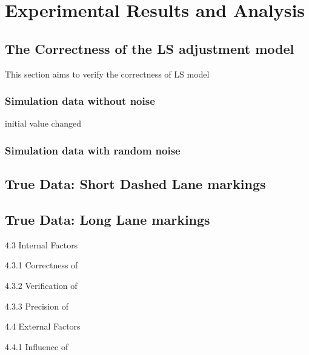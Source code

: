 
\chapter{Experimental Results and Analysis}
\label{chap:k3}

\section{The Correctness of the LS adjustment model}

This section aims to verify the correctness of LS model

\subsection{Simulation data without noise}
initial value changed

\subsection{Simulation data with random noise}




\section{True Data: Short Dashed Lane markings}



\section{True Data: Long Lane markings}



4.3 Internal Factors

4.3.1 Correctness of

4.3.2 Verification of

4.3.3 Precision of


4.4 External Factors

4.4.1 Influence of 

\blinddocument
